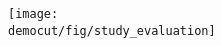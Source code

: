 
\begin{table*}
  \centering
  \centering
\texttt{[image: \\democut/fig/study\_evaluation]}
  \caption{Quantitative analysis of the user evaluation.}
  \label{tab:table2}
\end{table*}

